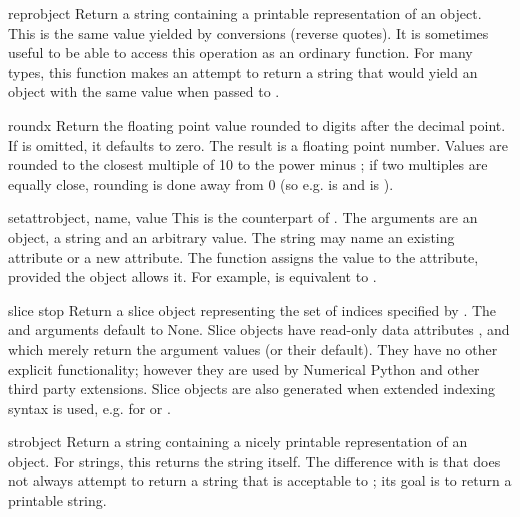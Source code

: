 \begin{funcdesc}{repr}{object}
Return a string containing a printable representation of an object.
This is the same value yielded by conversions (reverse quotes).
It is sometimes useful to be able to access this operation as an
ordinary function.  For many types, this function makes an attempt
to return a string that would yield an object with the same value
when passed to .
\end{funcdesc}

\begin{funcdesc}{round}{x}
  Return the floating point value  rounded to  digits
  after the decimal point.  If  is omitted, it defaults to zero.
  The result is a floating point number.  Values are rounded to the
  closest multiple of 10 to the power minus ; if two multiples
  are equally close, rounding is done away from 0 (so e.g.
   is  and  is ).
\end{funcdesc}

\begin{funcdesc}{setattr}{object, name, value}
  This is the counterpart of .  The arguments are an
  object, a string and an arbitrary value.  The string may name an
  existing attribute or a new attribute.  The function assigns the
  value to the attribute, provided the object allows it.  For example,
   is equivalent to
  .
\end{funcdesc}

\begin{funcdesc}{slice}{ stop}
Return a slice object representing the set of indices specified by
.  The 
and  arguments default to None.  Slice objects have
read-only data attributes ,  and 
which merely return the argument values (or their default).  They have
no other explicit functionality; however they are used by Numerical
Python and other third party extensions.
Slice objects are also generated when extended indexing syntax is
used, e.g. for  or .
\end{funcdesc}

\begin{funcdesc}{str}{object}
Return a string containing a nicely printable representation of an
object.  For strings, this returns the string itself.  The difference
with  is that  does not
always attempt to return a string that is acceptable to ;
its goal is to return a printable string.
\end{funcdesc}

